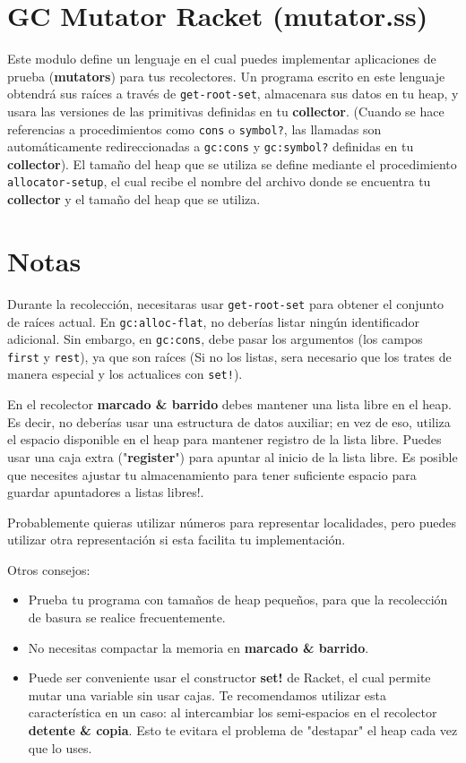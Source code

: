 \documentclass{article}
\begin{document}
\section*{GC Mutator Racket (mutator.ss)}
Este modulo define un lenguaje en el cual puedes implementar aplicaciones de prueba (\textbf{mutators}) para
tus recolectores. Un programa escrito en este lenguaje obtendrá sus raíces a través de \verb;get-root-set;,
almacenara sus datos en tu heap, y usara las versiones de las primitivas definidas en tu \textbf{collector}.
(Cuando se hace referencias a procedimientos como \verb;cons; o \verb;symbol?;, las llamadas son automáticamente
redireccionadas a \verb;gc:cons; y \verb;gc:symbol?; definidas en tu \textbf{collector}).
El tamaño del heap que se utiliza se define mediante el procedimiento \verb;allocator-setup;, el cual recibe
el nombre del archivo donde se encuentra tu \textbf{collector} y el tamaño del heap que se utiliza.

\section*{Notas}
Durante la recolección, necesitaras usar \verb;get-root-set; para obtener el conjunto de raíces actual. En
\verb;gc:alloc-flat;, no deberías listar ningún identificador adicional. Sin embargo, en \verb;gc:cons;, debe
pasar los argumentos (los campos \verb;first; y \verb;rest;), ya que son raíces (Si no los listas, sera necesario
que los trates de manera especial y los actualices con \verb;set!;).

En el recolector \textbf{marcado & barrido} debes mantener una lista libre en el heap. Es decir, no deberías
usar una estructura de datos auxiliar; en vez de eso, utiliza el espacio disponible en el heap para mantener
registro de la lista libre. Puedes usar una caja extra ("\textbf{register}") para apuntar al inicio de la lista
libre. Es posible que necesites ajustar tu almacenamiento para tener suficiente espacio para guardar apuntadores
a listas libres!.

Probablemente quieras utilizar números para representar localidades, pero puedes utilizar otra representación
si esta facilita tu implementación.

Otros consejos:
\begin{itemize}
\item Prueba tu programa con tamaños de heap pequeños, para que la recolección de basura se realice
  frecuentemente.
\item No necesitas compactar la memoria en \textbf{marcado & barrido}.
\item Puede ser conveniente usar el constructor \textbf{set!} de Racket, el cual permite mutar una variable
  sin usar cajas. Te recomendamos utilizar esta característica en un caso: al intercambiar los semi-espacios
  en el recolector \textbf{detente & copia}. Esto te evitara el problema de "destapar" el heap cada vez que lo
  uses.
\end{itemize}
\end{document}
